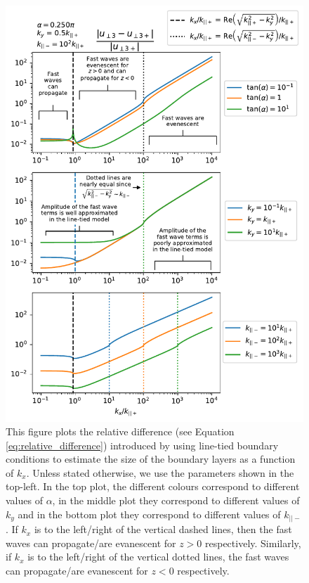 \begin{figure}
    \centering
    \includegraphics[width=\textwidth,height=0.8\textheight,keepaspectratio]{figures/chapter04/fast_wave_error_vs_kx.pdf}
    \caption{This figure plots the relative difference (see Equation \ref{eq:relative_difference}) introduced by using line-tied boundary conditions to estimate the size of the boundary layers as a function of $k_x$. Unless stated otherwise, we use the parameters shown in the top-left. In the top plot, the different colours correspond to different values of $\alpha$, in the middle plot they correspond to different values of $k_y$ and in the bottom plot they correspond to different values of $k_{||-}$. If $k_x$ is to the left/right of the vertical dashed lines, then the fast waves can propagate/are evanescent for $z>0$ respectively. Similarly, if $k_x$ is to the left/right of the vertical dotted lines, the fast waves can propagate/are evanescent for $z<0$ respectively.}
    \label{fig:fast_wave_error_vs_kx}
\end{figure}

